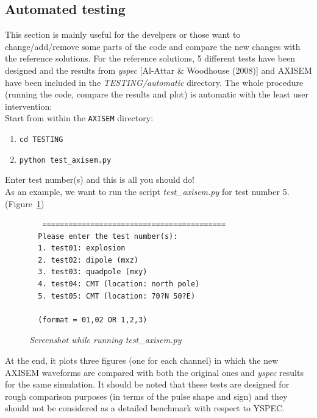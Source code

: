 \subsection{Automated testing}

This section is mainly useful for the develpers or those want to change/add/remove some parts of the code and compare the new changes with the reference solutions.
For the reference solutions, 5 different tests have been designed and
the results from \textit{yspec} [Al-Attar \& Woodhouse (2008)] and AXISEM have been included in the \textit{TESTING/automatic} directory.
The whole procedure (running the code, compare the results and plot) is automatic with the least user intervention: \\

Start from within the {\tt AXISEM} directory:
 \begin{enumerate}
 \item {\tt cd TESTING}
 \item {\tt python test\_axisem.py}
 \end{enumerate}

Enter test number(s) and this is all you should do! \\

\noindent As an example, we want to run the script \textit{test\_axisem.py} for test number 5. (Figure~\ref{test_axisem})

\begin{figure}[htb]
  \begin{verbatim}
   ==========================================
  Please enter the test number(s):
  1. test01: explosion
  2. test02: dipole (mxz)
  3. test03: quadpole (mxy)
  4. test04: CMT (location: north pole)
  5. test05: CMT (location: 70?N 50?E)

  (format = 01,02 OR 1,2,3)
  \end{verbatim}
  \caption{\textit{Screenshot while running test\_axisem.py}}
\label{test_axisem}
\end{figure}

\noindent At the end, it plots three figures (one for each channel)
in which the new AXISEM waveforms are compared with both the original ones and \textit{yspec} results for the same simulation.
It should be noted that these tests are designed for rough comparison purposes (in terms of the pulse shape and sign) and they should not be considered as a detailed benchmark with respect to YSPEC. \\

